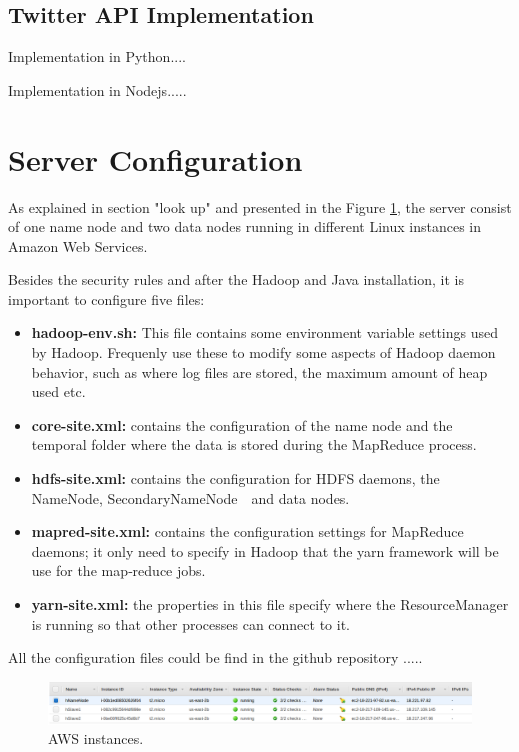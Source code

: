 \documentclass{article}
\newcommand*\setcaptioncitation[1]{\def\captioncitation{\textit{Source:}~#1}}
\let\captioncitation\relax
\begin{document}
        \subsection{Twitter API Implementation}

        Implementation in Python....

        Implementation in Nodejs.....
        \section{Server Configuration}

        As  explained in section "look up" and presented in the Figure \ref{}, the server consist of one name node and two data nodes running in different Linux instances in Amazon Web Services.

        Besides the security rules and after the Hadoop and Java installation, it is important to configure five files:
            \begin{itemize}
                \item \textbf{hadoop-env.sh:} This file contains some environment variable settings used by Hadoop. Frequenly use these to modify some aspects of Hadoop daemon behavior, such as where 
                log files are stored, the maximum amount of heap used etc.                
                \item \textbf{core-site.xml:} contains the configuration of the name node and the temporal folder where the data is stored during the MapReduce process.
                \item \textbf{hdfs-site.xml:} contains the configuration for HDFS daemons, the NameNode, SecondaryNameNode  and data nodes.
                \item \textbf{mapred-site.xml:} contains the configuration settings for MapReduce daemons; it only need to specify in Hadoop that the yarn framework will be use for the map‐reduce jobs.
                \item \textbf{yarn-site.xml:} the properties in this file specify where the ResourceManager is running so that other processes can connect to it.
            \end{itemize}
        All the configuration files could be find in the github repository .....
        \begin{figure}[H]
            \centering 
            \includegraphics[width=1\linewidth]{./img/instances.png}
            \setcaptioncitation{Screenshot idk.}
            \caption{AWS instances.}
            \label{fig:instances}
        \end{figure}
\end{document}
